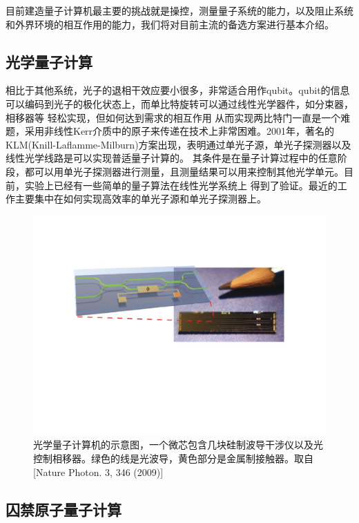 目前建造量子计算机最主要的挑战就是操控，测量量子系统的能力，以及阻止系统和外界环境的相互作用的能力，我们将对目前主流的备选方案进行基本介绍。

  \subsection{光学量子计算}

相比于其他系统，光子的退相干效应要小很多，非常适合用作qubit。qubit的信息可以编码到光子的极化状态上，而单比特旋转可以通过线性光学器件，如分束器，相移器等 轻松实现，但如何达到需求的相互作用
从而实现两比特门一直是一个难题，采用非线性Kerr介质中的原子来传递在技术上非常困难。2001年，著名的KLM(Knill-Laflamme-Milburn)方案出现\cite{KLM}，表明通过单光子源，单光子探测器以及线性光学线路是可以实现普适量子计算的。
其条件是在量子计算过程中的任意阶段，都可以用单光子探测器进行测量，且测量结果可以用来控制其他光学单元。目前，实验上已经有一些简单的量子算法在线性光学系统上
得到了验证\cite{optics1,optics2}。最近的工作主要集中在如何实现高效率的单光子源\cite{optics5,optics6}和单光子探测器\cite{optics3,optics4}上。

 \begin{figure}[htbp]
            \begin{center}
              \includegraphics[width= 0.8\columnwidth]{figures/optics.pdf}
              \caption{光学量子计算机的示意图，一个微芯包含几块硅制波导干涉仪以及光控制相移器。绿色的线是光波导，黄色部分是金属制接触器。取自[Nature Photon. 3,
346 (2009)\cite{optics7}]
              }
              \label{photon}
            \end{center}
  \end{figure}

 \subsection{囚禁原子量子计算}

